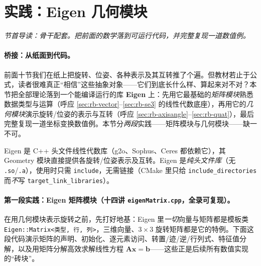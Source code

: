 \section{实践：Eigen 几何模块}
\label{sec:rb-eigen}
\noindent\emph{节首导读：骨干配套。把前面的数学落到可运行代码，并完整复现一道数值例。}

\paragraph{桥接：从纸面到代码。}前面十节我们在纸上把旋转、位姿、各种表示及其互转推了个遍。但教材若止于公式，读者很难真正“相信”这些抽象对象——它们到底长什么样、算起来对不对？本节把全部理论落到一个能编译运行的库 \textbf{Eigen} 上：先用它最基础的\emph{矩阵模块}熟悉数据类型与运算（呼应 \cref{sec:rb-vector}--\cref{sec:rb-se3} 的线性代数底座），再用它的\emph{几何模块}演示旋转/位姿的表示与互转（呼应 \cref{sec:rb-axisangle}--\cref{sec:rb-quat}），最后完整复现一道坐标变换数值例。本节分\emph{两段}实践——矩阵模块与几何模块——缺一不可\cite{gaoxiang2019slam14}。

Eigen 是 C++ 头文件线性代数库（g2o、Sophus、Ceres 都依赖它），其 Geometry 模块直接提供各旋转/位姿表示及互转。Eigen 是\emph{纯头文件库}（无 \texttt{.so}/\texttt{.a}），使用时只需 \texttt{include}，无需链接（CMake 里只给 \texttt{include\_directories} 而\emph{不}写 \texttt{target\_link\_libraries}）\cite{gaoxiang2019slam14}。

\paragraph{第一段实践：Eigen 矩阵模块（十四讲 \texttt{eigenMatrix.cpp}，全录可复现）。}在用几何模块表示旋转之前，先打好地基：Eigen 里\emph{一切}向量与矩阵都是模板类 \texttt{Eigen::Matrix<类型, 行, 列>}，三维向量、$3\times3$ 旋转矩阵都是它的特例。下面这段代码演示矩阵的声明、初始化、逐元素访问、转置/迹/逆/行列式、特征值分解，以及用矩阵分解高效求解线性方程 $\mathbf{A}\mathbf{x}=\mathbf{b}$——这些正是后续所有数值实现的“砖块”。

